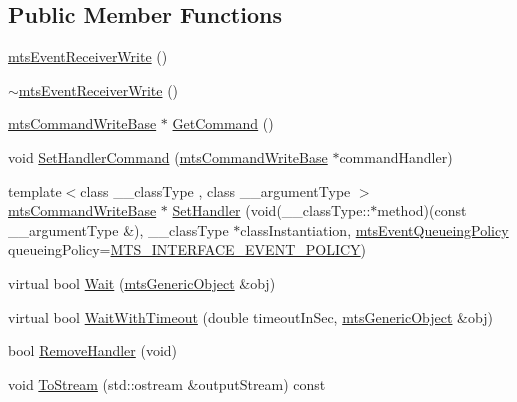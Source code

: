 \subsection*{Public Member Functions}
\begin{DoxyCompactItemize}
\item 
\hyperlink{classmts_event_receiver_write_a119ce623a0ccbef34db32507b55b0ca1}{mts\+Event\+Receiver\+Write} ()
\item 
\hyperlink{classmts_event_receiver_write_aebccfcc96743e1326633cdadcaa84a78}{$\sim$mts\+Event\+Receiver\+Write} ()
\item 
\hyperlink{classmts_command_write_base}{mts\+Command\+Write\+Base} $\ast$ \hyperlink{classmts_event_receiver_write_adf463bcd5e22775924a1eacad44fdf1f}{Get\+Command} ()
\item 
void \hyperlink{classmts_event_receiver_write_a3913dcaf55d377ca5bd07a21dbe768af}{Set\+Handler\+Command} (\hyperlink{classmts_command_write_base}{mts\+Command\+Write\+Base} $\ast$command\+Handler)
\item 
{\footnotesize template$<$class \+\_\+\+\_\+class\+Type , class \+\_\+\+\_\+argument\+Type $>$ }\\\hyperlink{classmts_command_write_base}{mts\+Command\+Write\+Base} $\ast$ \hyperlink{classmts_event_receiver_write_af1a1ff29b204324a2e112891a720b770}{Set\+Handler} (void(\+\_\+\+\_\+class\+Type\+::$\ast$method)(const \+\_\+\+\_\+argument\+Type \&), \+\_\+\+\_\+class\+Type $\ast$class\+Instantiation, \hyperlink{mts_forward_declarations_8h_a9286ac2ca46e5bcd57059550faa96916}{mts\+Event\+Queueing\+Policy} queueing\+Policy=\hyperlink{mts_forward_declarations_8h_a9286ac2ca46e5bcd57059550faa96916a3d4338e85690d50e9ab167be77cdefa0}{M\+T\+S\+\_\+\+I\+N\+T\+E\+R\+F\+A\+C\+E\+\_\+\+E\+V\+E\+N\+T\+\_\+\+P\+O\+L\+I\+C\+Y})
\item 
virtual bool \hyperlink{classmts_event_receiver_write_ad7f8bb9b2defdb6c83d796452dc4aa0d}{Wait} (\hyperlink{classmts_generic_object}{mts\+Generic\+Object} \&obj)
\item 
virtual bool \hyperlink{classmts_event_receiver_write_a7b2264ea198deafacc718d8684f0f5d6}{Wait\+With\+Timeout} (double timeout\+In\+Sec, \hyperlink{classmts_generic_object}{mts\+Generic\+Object} \&obj)
\item 
bool \hyperlink{classmts_event_receiver_write_a2cbad989a059f869eb5d19f2a2f1c9a4}{Remove\+Handler} (void)
\item 
void \hyperlink{classmts_event_receiver_write_a2a00fee6e19110e1e041f5ca498d14dc}{To\+Stream} (std\+::ostream \&output\+Stream) const 
\end{DoxyCompactItemize}
